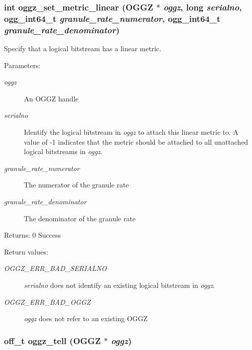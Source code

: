 \subsubsection{\setlength{\rightskip}{0pt plus 5cm}int oggz\_\-set\_\-metric\_\-linear ({\bf OGGZ} $\ast$ {\em oggz}, long {\em serialno}, ogg\_\-int64\_\-t {\em granule\_\-rate\_\-numerator}, ogg\_\-int64\_\-t {\em granule\_\-rate\_\-denominator})}\label{group__seek__api_ga1}


Specify that a logical bitstream has a linear metric. 

\begin{Desc}
\item[Parameters:]
\begin{description}
\item[{\em oggz}]An OGGZ handle \item[{\em serialno}]Identify the logical bitstream in {\em oggz\/} to attach this linear metric to. A value of -1 indicates that the metric should be attached to all unattached logical bitstreams in {\em oggz\/}. \item[{\em granule\_\-rate\_\-numerator}]The numerator of the granule rate \item[{\em granule\_\-rate\_\-denominator}]The denominator of the granule rate \end{description}
\end{Desc}
\begin{Desc}
\item[Returns:]0 Success \end{Desc}
\begin{Desc}
\item[Return values:]
\begin{description}
\item[{\em OGGZ\_\-ERR\_\-BAD\_\-SERIALNO}]{\em serialno\/} does not identify an existing logical bitstream in {\em oggz\/}. \item[{\em OGGZ\_\-ERR\_\-BAD\_\-OGGZ}]{\em oggz\/} does not refer to an existing OGGZ \end{description}
\end{Desc}
\subsubsection{\setlength{\rightskip}{0pt plus 5cm}off\_\-t oggz\_\-tell ({\bf OGGZ} $\ast$ {\em oggz})}\label{group__seek__api_ga7}


